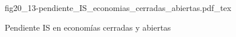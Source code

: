 \begin{figure}[h]
\centering
\def\svgwidth{0.5\textwidth}
{fig20_13-pendiente_IS_economias_cerradas_abiertas.pdf_tex}
\caption{Pendiente IS en economías cerradas y abiertas}
\label{fig20_13-pendiente_IS_economias_cerradas_abiertas}
\end{figure}
